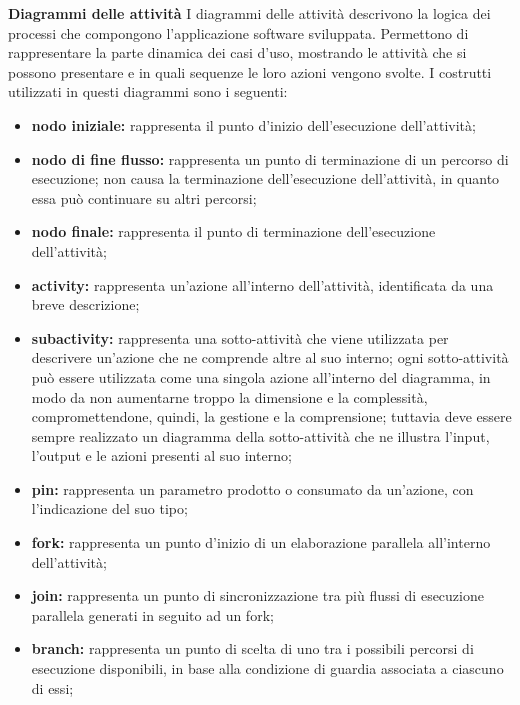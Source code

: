 						\textbf{Diagrammi delle attività}
						\newline
						\newline
						\hangindent=0.6cm I diagrammi delle attività descrivono la logica dei processi che compongono l'applicazione software sviluppata. Permettono di rappresentare la parte dinamica dei casi d'uso, mostrando le attività che si possono presentare e in quali sequenze le loro azioni vengono svolte.
						\newline
						\hangindent=0.6cm I costrutti utilizzati in questi diagrammi sono i seguenti:
						\begin{itemize}[leftmargin=1.5cm]
							\item \textbf{nodo iniziale:} rappresenta il punto d'inizio dell'esecuzione dell'attività;
							\item \textbf{nodo di fine flusso:} rappresenta un punto di terminazione di un percorso di esecuzione; non causa la terminazione dell'esecuzione dell'attività, in quanto essa può continuare su altri percorsi; 
							\item \textbf{nodo finale:} rappresenta il punto di terminazione dell'esecuzione dell'attività;
							\item \textbf{activity:} rappresenta un'azione all'interno dell'attività, identificata da una breve descrizione;
							\item \textbf{subactivity:} rappresenta una sotto-attività che viene utilizzata per descrivere un'azione che ne comprende altre al suo interno; ogni sotto-attività può essere utilizzata come una singola azione all'interno del diagramma, in modo da non aumentarne troppo la dimensione e la complessità, compromettendone, quindi, la gestione e la comprensione; tuttavia deve essere sempre realizzato un diagramma della sotto-attività che ne illustra l'input, l'output e le azioni presenti al suo interno;
							\item \textbf{pin:} rappresenta un parametro prodotto o consumato da un'azione, con l'indicazione del suo tipo;
							\item \textbf{fork:} rappresenta un punto d'inizio di un elaborazione parallela all'interno dell'attività;
							\item \textbf{join:} rappresenta un punto di sincronizzazione tra più flussi di esecuzione parallela generati in seguito ad un fork;
							\item \textbf{branch:} rappresenta un punto di scelta di uno tra i possibili percorsi di esecuzione disponibili, in base alla condizione di guardia associata a ciascuno di essi;

\end{itemize}
